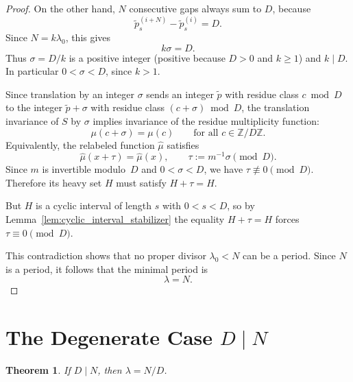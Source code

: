 \documentclass[11pt,reqno]{amsart}
\theoremstyle{plain}
\newtheorem{theorem}{Theorem}[section]
\theoremstyle{definition}
\theoremstyle{remark}
\begin{document}
\begin{proof}
On the other hand, \(N\) consecutive gaps always sum to \(D\), because
\[
    \tilde{p}_s^{(i+N)}-\tilde{p}_s^{(i)} = D.
\]
Since \(N=k\lambda_0\), this gives
\[
    k\sigma = D.
\]
Thus \(\sigma = D/k\) is a positive integer (positive because \(D>0\)
and \(k\ge 1\)) and \(k\mid D\).  In particular \(0 < \sigma < D\),
since \(k>1\).

Since translation by an integer \(\sigma\) sends an integer \(\tilde p\)
with residue class \(c \bmod D\) to the integer \(\tilde p + \sigma\)
with residue class \((c + \sigma) \bmod D\), the translation invariance
of \(S\) by \(\sigma\) implies invariance of the residue multiplicity
function:
\[
    \mu(c+\sigma)=\mu(c) \qquad \text{for all } c\in \mathbb{Z}/D\mathbb{Z}.
\]
Equivalently, the relabeled function \(\hat{\mu}\) satisfies
\[
    \hat{\mu}(x+\tau)=\hat{\mu}(x), \qquad \tau := m^{-1}\sigma \pmod D.
\]
Since \(m\) is invertible modulo~\(D\) and \(0<\sigma<D\), we have
\(\tau\not\equiv 0\pmod D\).
Therefore its heavy set \(H\) must satisfy \(H+\tau = H\).

But \(H\) is a cyclic interval of length \(s\) with \(0 < s < D\), so
by Lemma~\ref{lem:cyclic_interval_stabilizer} the equality
\(H + \tau = H\) forces \(\tau \equiv 0 \pmod{D}\).

This contradiction shows that no proper divisor \(\lambda_0 < N\) can be a
period.  Since \(N\) is a period, it follows that the minimal period is
\[
    \lambda = N.
\]
\end{proof}

\section{\texorpdfstring{The Degenerate Case \(D \mid N\)}{The Degenerate Case D divides N}}\label{sec:degenerate}

\begin{theorem}\label{thm:degenerate}
If \(D \mid N\), then \(\lambda = N/D\).
\end{theorem}
\end{document}
